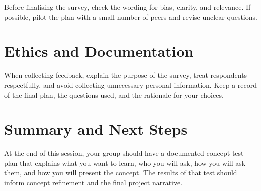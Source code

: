 Before finalising the survey, check the wording for bias, clarity, and relevance. If possible, pilot the plan with a small number of peers and revise unclear questions.

\section{Ethics and Documentation}

When collecting feedback, explain the purpose of the survey, treat respondents respectfully, and avoid collecting unnecessary personal information. Keep a record of the final plan, the questions used, and the rationale for your choices.

\section{Summary and Next Steps}

At the end of this session, your group should have a documented concept-test plan that explains what you want to learn, who you will ask, how you will ask them, and how you will present the concept. The results of that test should inform concept refinement and the final project narrative.
